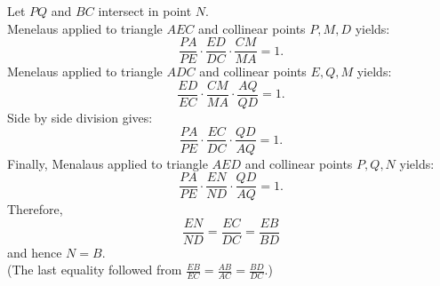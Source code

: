 \documentclass{article}
\begin{document}
\begin{enumerate}[1.]
Let $PQ$ and $BC$ intersect in point $N$.\\
Menelaus applied to triangle $AEC$ and collinear points $P,M,D$ yields: $$\frac{PA}{PE} \cdot \frac{ED}{DC} \cdot \frac{CM}{MA} = 1.$$
Menelaus applied to triangle $ADC$ and collinear points $E,Q,M$ yields: $$\frac{ED}{EC} \cdot \frac{CM}{MA} \cdot \frac{AQ}{QD} = 1.$$
Side by side division gives: $$\frac{PA}{PE} \cdot \frac{EC}{DC} \cdot \frac{QD}{AQ} = 1.$$
Finally, Menalaus applied to triangle $AED$ and collinear points $P,Q,N$ yields: $$\frac{PA}{PE} \cdot \frac{EN}{ND} \cdot \frac{QD}{AQ} = 1.$$
Therefore, $$\frac{EN}{ND} = \frac{EC}{DC} = \frac{EB}{BD}$$ and hence $N = B$.\\
(The last equality followed from $\frac{EB}{EC} = \frac{AB}{AC} = \frac{BD}{DC}$.)


\end{enumerate}
\end{document}
